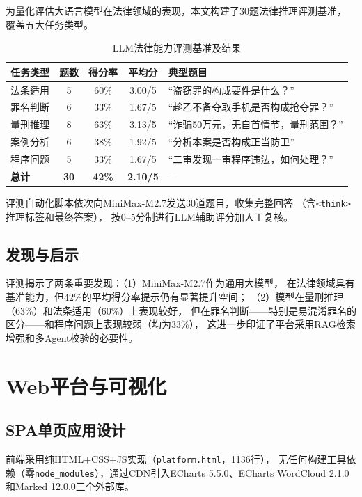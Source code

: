 \documentclass[12pt,a4paper,twoside]{ctexart}
\begin{document}
为量化评估大语言模型在法律领域的表现，本文构建了30题法律推理评测基准，
覆盖五大任务类型。

\begin{table}[H]
\centering
\caption{LLM法律能力评测基准及结果}
\label{tab:benchmark}
\begin{tabular}{@{}lcccp{4.5cm}@{}}
\toprule
\textbf{任务类型} & \textbf{题数} & \textbf{得分率} & \textbf{平均分} & \textbf{典型题目} \\
\midrule
法条适用   & 5  & 60\% & 3.00/5 & ``盗窃罪的构成要件是什么？'' \\
罪名判断   & 6  & 33\% & 1.67/5 & ``趁乙不备夺取手机是否构成抢夺罪？'' \\
量刑推理   & 8  & 63\% & 3.13/5 & ``诈骗50万元，无自首情节，量刑范围？'' \\
案例分析   & 6  & 38\% & 1.92/5 & ``分析本案是否构成正当防卫'' \\
程序问题   & 5  & 33\% & 1.67/5 & ``二审发现一审程序违法，如何处理？'' \\
\midrule
\textbf{总计} & \textbf{30} & \textbf{42\%} & \textbf{2.10/5} & — \\
\bottomrule
\end{tabular}
\end{table}

评测自动化脚本依次向MiniMax-M2.7发送30道题目，收集完整回答
（含\texttt{<think>}推理标签和最终答案），
按0--5分制进行LLM辅助评分加人工复核。

\subsection{发现与启示}

评测揭示了两条重要发现：（1）MiniMax-M2.7作为通用大模型，
在法律领域具有基准能力，但42\%的平均得分率提示仍有显著提升空间；
（2）模型在量刑推理（63\%）和法条适用（60\%）上表现较好，
但在罪名判断——特别是易混淆罪名的区分——和程序问题上表现较弱（均为33\%），
这进一步印证了平台采用RAG检索增强和多Agent校验的必要性。

\section{Web平台与可视化}

\subsection{SPA单页应用设计}

前端采用纯HTML+CSS+JS实现（\texttt{platform.html}，1136行），
无任何构建工具依赖（零\texttt{node\_modules}），通过CDN引入ECharts 5.5.0、ECharts WordCloud 2.1.0
和Marked 12.0.0三个外部库。
\end{document}
